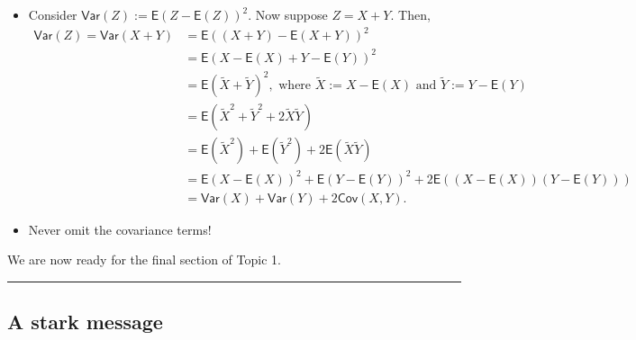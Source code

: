 \documentclass[
  letterpaper,
  DIV=11,
  numbers=noendperiod]{scrartcl}
\providecommand{\tightlist}{%
  \setlength{\itemsep}{0pt}\setlength{\parskip}{0pt}}
\begin{document}
\begin{tcolorbox}[enhanced jigsaw, arc=.35mm, bottomrule=.15mm, bottomtitle=1mm, breakable, colback=white, colbacktitle=quarto-callout-note-color!10!white, colframe=quarto-callout-note-color-frame, coltitle=black, left=2mm, leftrule=.75mm, opacityback=0, opacitybacktitle=0.6, rightrule=.15mm, title=\textcolor{quarto-callout-note-color}{\faInfo}\hspace{0.5em}{Algebra}, titlerule=0mm, toprule=.15mm, toptitle=1mm]

\begin{itemize}
\tightlist
\item
  Consider \(\mathsf{Var}(Z) := \mathsf{E}(Z-\mathsf{E}(Z))^2\). Now
  suppose \(Z = X+Y\). Then,
  \[\begin{aligned}\mathsf{Var}(Z)=\mathsf{Var}(X+Y)&=\mathsf{E}\left((X+Y) - \mathsf{E}(X+Y)\right)^2 \\ &= \mathsf{E}(X - \mathsf{E}(X) + Y - \mathsf{E}(Y))^2\\&=\mathsf{E}\left(\tilde{X} + \tilde{Y}\right)^2, \text{ where }\tilde{X} := X- \mathsf{E}(X)\text{ and }\tilde{Y} := Y - \mathsf{E}(Y)\\&=\mathsf{E}\left(\tilde{X}^2 + \tilde{Y}^2 + 2\tilde{X}\tilde{Y}\right) \\&=\mathsf{E}\left(\tilde{X}^2\right) + \mathsf{E}\left(\tilde{Y}^2\right) + 2\mathsf{E}\left(\tilde{X}\tilde{Y}\right)\\&=\mathsf{E}(X-\mathsf{E}(X))^2 +\mathsf{E}(Y-\mathsf{E}(Y))^2 + 2 \mathsf{E}((X-\mathsf{E}(X))(Y-\mathsf{E}(Y)))\\&=\mathsf{Var}(X)+\mathsf{Var}(Y) + 2\mathsf{Cov}(X,Y).\end{aligned}\]
\item
  Never omit the covariance terms!
\end{itemize}

\end{tcolorbox}

We are now ready for the final section of Topic 1.

\begin{center}\rule{0.5\linewidth}{0.5pt}\end{center}

\subsection{A stark message}\label{a-stark-message}
\end{document}
